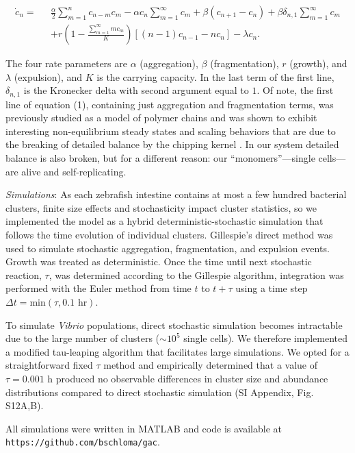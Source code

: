\begin{align}
\dot{c}_n = \text{ }& \frac{\alpha}{2}\sum_{m=1}^{n} c_{n-m}c_m - \alpha c_n \sum_{m=1}^{\infty}c_m+\beta(c_{n+1}- c_n) + \beta\delta_{n,1}\sum_{m=1}^{\infty}c_m\nonumber\\[6pt]
&+r\left(1-\frac{\sum_{m=1}^{\infty}mc_m}{K}\right)\left[(n-1)c_{n-1} - nc_n\right]  - \lambda c_n. 
\end{align}

\noindent The four rate parameters are $\alpha$ (aggregation), $\beta$ (fragmentation), $r$ (growth), and $\lambda$ (expulsion), and $K$ is the carrying capacity. In the last term of the first line,  $\delta_{n,1}$ is the Kronecker delta with second argument equal to $1$. Of note, the first line of equation (1), containing just aggregation and fragmentation terms, was previously studied as a model of polymer chains and was shown to exhibit interesting non-equilibrium steady states and scaling behaviors that are due to the breaking of detailed balance by the chipping kernel \cite{krapivsky1996transitional}. In our system detailed balance is also broken, but for a different reason: our ``monomers''---single cells---are alive and self-replicating.

\textit{Simulations}: As each zebrafish intestine contains at most a few hundred bacterial clusters, finite size effects and stochasticity impact cluster statistics, so we implemented the model as a hybrid deterministic-stochastic simulation that follows the time evolution of individual clusters. Gillespie's direct method \cite{gillespie1977exact} was used to simulate stochastic aggregation, fragmentation, and expulsion events. Growth was treated as deterministic. Once the time until next stochastic reaction, $\tau$, was determined according to the Gillespie algorithm, integration was performed with the Euler method from time $t$ to $t+\tau$ using a time step $\Delta t = \text{min}(\tau, 0.1 \text{ hr})$. 

To simulate \textit{Vibrio} populations, direct stochastic simulation becomes intractable due to the large number of clusters ($\sim 10^5$ single cells). We therefore implemented a modified tau-leaping algorithm \cite{gillespie2001approximate} that facilitates large simulations. We opted for a straightforward fixed $\tau$ method and empirically determined that a value of $\tau = 0.001$ h produced no observable differences in cluster size and abundance distributions compared to direct stochastic simulation (SI Appendix, Fig. S12A,B).

All simulations were written in MATLAB and code is available at \texttt{https://github.com/bschloma/gac}.


